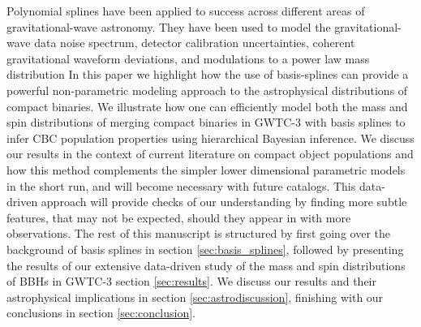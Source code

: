 Polynomial splines have been applied to success across different areas of gravitational-wave astronomy. They have been used to model the gravitational-wave data noise spectrum, 
detector calibration uncertainties, coherent gravitational waveform deviations, and modulations to a power law mass distribution \citep{Littenberg_2015,Edwards_2018,B_Farr_etal_2014,Edelman_2021,Edelman_2022ApJ}
In this paper we highlight how the use of basis-splines can provide a powerful non-parametric modeling approach to the astrophysical distributions of compact 
binaries. We illustrate how one can efficiently model both the mass and spin distributions of merging compact binaries in GWTC-3 with basis splines to infer CBC population properties using 
hierarchical Bayesian inference. We discuss our results in the context of current literature on compact object populations and how this method complements the simpler lower 
dimensional parametric models in the short run, and will become necessary with future catalogs. This data-driven approach will provide checks of our understanding by finding more 
subtle features, that may not be expected, should they appear in with more observations. The rest of this manuscript is structured by first going over the background of basis splines in 
section \ref{sec:basis_splines}, followed by presenting the results of our extensive data-driven study of the mass and spin distributions of BBHs in GWTC-3 section \ref{sec:results}. We 
discuss our results and their astrophysical implications in section \ref{sec:astrodiscussion}, finishing with our conclusions in section \ref{sec:conclusion}.